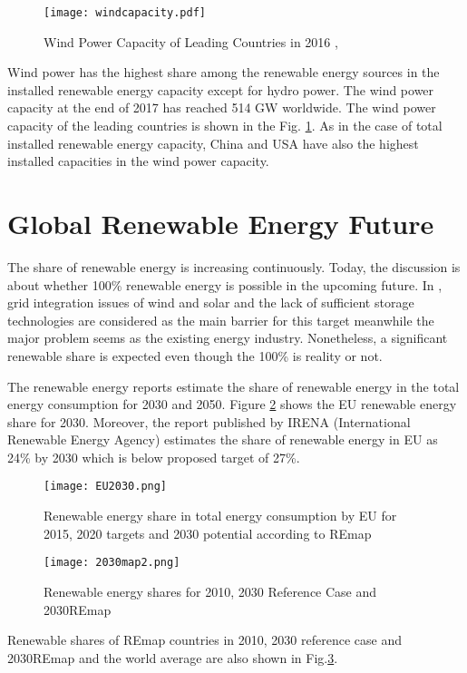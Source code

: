 \begin{figure}[h!]
	\centering
	\texttt{[image: windcapacity.pdf]}
	\caption{Wind Power Capacity of Leading Countries in 2016 \cite{InternationalRenewableEnergyAgencyIRENA2018},\cite{InternationalRenewableEnergyAgency2017}}
	\label{windcap}
\end{figure}
Wind power has the highest share among the renewable energy sources in the installed renewable energy capacity except for hydro power. The wind power capacity at the end of 2017 has reached 514 GW worldwide\cite{InternationalRenewableEnergyAgencyIRENA2018}. The wind power capacity of the leading countries is shown in the Fig. \ref{windcap}. As in the case of total installed renewable energy capacity, China and USA have also the highest installed capacities in the wind power capacity. \par
\section{Global Renewable Energy Future}
The share of renewable energy is increasing continuously. Today, the discussion is about whether 100\% renewable energy is possible in the upcoming future. In \cite{REN212017d}, grid integration issues of wind and solar and the lack of sufficient storage technologies are considered as the main barrier for this target meanwhile the major problem seems as the existing energy industry. Nonetheless, a significant renewable share is expected even though the 100\% is reality or not.\par
The renewable energy reports estimate the share of renewable energy in the total energy consumption for 2030 and 2050. Figure \ref{EU2030} shows the EU renewable energy share for 2030. Moreover, the report published by IRENA (International Renewable Energy Agency) estimates the share of renewable energy in EU as 24\% by 2030 which is below proposed target of 27\%\cite{IRENA2014}.\par
\begin{figure}[h!]
	\centering
	\texttt{[image: EU2030.png]}
	\caption{Renewable energy share in total energy consumption by EU for 2015, 2020 targets and 2030 potential according to REmap \cite{EuropeanCommission2018}}
	\label{EU2030}
\end{figure}
\begin{figure}[h!]
	\centering
	\texttt{[image: 2030map2.png]}
	\caption{Renewable energy shares for 2010, 2030 Reference Case and 2030REmap \cite{IRENA2014}}
	\label{2030map}
\end{figure}
Renewable shares of REmap countries in 2010, 2030 reference case and 2030REmap and the world average are also shown in Fig.\ref{2030map}. 
